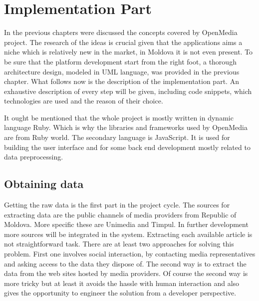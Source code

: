 \section{Implementation Part}
In the previous chapters were discussed the concepts covered by OpenMedia project. The research of the ideas is crucial given that the applications aims a niche which is relatively new in the market, in Moldova it is not even present. To be sure that the platform development start from the right foot, a thorough architecture design, modeled in UML language, was provided in the previous chapter. What follows now is the description of the implementation part. An exhaustive description of every step will be given, including code snippets, which technologies are used and the reason of their choice.

It ought be mentioned that the whole project is mostly written in dynamic language Ruby. Which is why the libraries and frameworks used by OpenMedia are from Ruby world. The secondary language is JavaScript. It is used for building the user interface and for some back end development mostly related to data preprocessing.

\subsection{Obtaining data}
Getting the raw data is the first part in the project cycle. The sources for extracting data are the public channels of media providers from Republic of Moldova. More specific these are Unimedia and Timpul. In further development more sources will be integrated in the system. Extracting each available article is not straightforward task. There are at least two approaches for solving this problem. First one involves social interaction, by contacting media representatives and asking access to the data they dispose of. The second way is to extract the data from the web sites hosted by media providers. Of course the second way is more tricky but at least it avoids the hassle with human interaction and also gives the opportunity to engineer the solution from a developer perspective.

